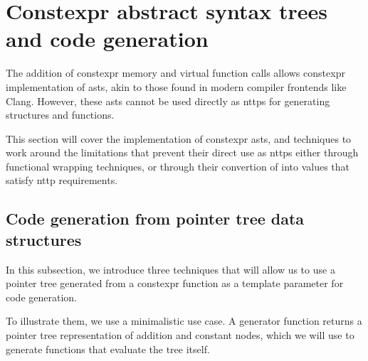 \documentclass[../main]{subfiles}
\begin{document}
\section{
  Constexpr abstract syntax trees and code generation
}

The addition of \gls{constexpr} memory and virtual function calls allows
\gls{constexpr} implementation of \glspl{ast}, akin to those found
in modern \cpp compiler frontends like Clang.
However, these \glspl{ast} cannot be used directly as \glspl{nttp}
for generating structures and functions.

This section will cover the implementation of \gls{constexpr} \glspl{ast},
and techniques to work around the limitations that prevent their direct use as
\glspl{nttp} either through functional wrapping techniques, or through
their convertion of into values that satisfy \gls{nttp} requirements.

\subsection{
  Code generation from pointer tree data structures
}

\label{lbl:ptr-tree-codegen}

In this subsection, we introduce three techniques that will allow us to use
a pointer tree generated from a \gls{constexpr} function as a template parameter
for code generation.

To illustrate them, we use a minimalistic use case.
A generator function returns a pointer tree representation of addition and
constant nodes, which we will use to generate functions that evaluate
the tree itself.
\end{document}
